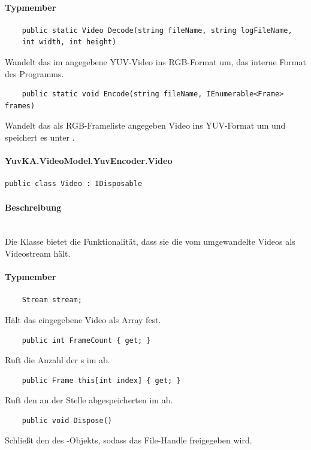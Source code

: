 \paragraph{Typmember}
\begin{itemize}

	\begin{verbatim}
	public static Video Decode(string fileName, string logFileName,
    int width, int height)
	\end{verbatim}
	Wandelt das im  angegebene YUV-Video ins RGB-Format um, das interne Format des Programms. 

	\begin{verbatim}
	public static void Encode(string fileName, IEnumerable<Frame> frames)
	\end{verbatim}
	Wandelt das als RGB-Frameliste angegeben Video ins YUV-Format um und speichert es unter . 

\end{itemize}
\setcounter{secnumdepth}{4}
\paragraph{YuvKA.VideoModel.YuvEncoder.Video}
\setcounter{secnumdepth}{3}
\begin{verbatim}
public class Video : IDisposable
\end{verbatim}

\paragraph{Beschreibung}~\\
Die Klasse  bietet die Funktionalität, dass sie die vom  umgewandelte Videos als Videostream hält.

\paragraph{Typmember}
\begin{itemize}

	\begin{verbatim}
	Stream stream;
	\end{verbatim}
	Hält das eingegebene Video als Array fest.

	\begin{verbatim}
	public int FrameCount { get; }
	\end{verbatim}
	Ruft die Anzahl der s im  ab.

	\begin{verbatim}
	public Frame this[int index] { get; }
	\end{verbatim}
	Ruft den an der Stelle  abgespeicherten  im  ab.

	\begin{verbatim}
	public void Dispose()
	\end{verbatim}
	Schließt den  des -Objekts, sodass das File-Handle freigegeben wird.

\end{itemize}

